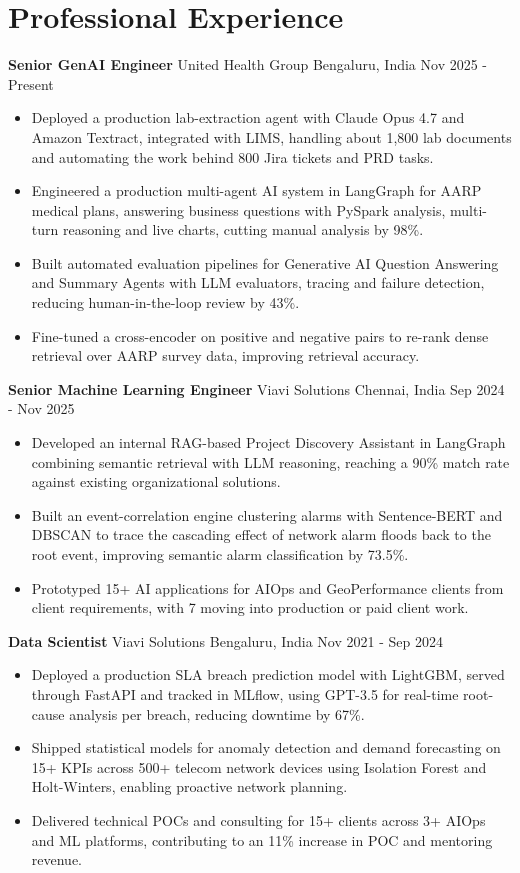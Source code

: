 \documentclass[10pt,a4paper]{article}
\newcommand{\role}[4]{\textbf{#1} \textbar{} #2 \hfill #3 \textbar{} #4\par}
\begin{document}
\section{Professional Experience}
\role{Senior GenAI Engineer}{United Health Group}{Bengaluru, India}{Nov 2025 - Present}
\begin{itemize}
  \item Deployed a production lab-extraction agent with Claude Opus 4.7 and Amazon Textract, integrated with LIMS, handling about 1,800 lab documents and automating the work behind 800 Jira tickets and PRD tasks.
  \item Engineered a production multi-agent AI system in LangGraph for AARP medical plans, answering business questions with PySpark analysis, multi-turn reasoning and live charts, cutting manual analysis by 98\%.
  \item Built automated evaluation pipelines for Generative AI Question Answering and Summary Agents with LLM evaluators, tracing and failure detection, reducing human-in-the-loop review by 43\%.
  \item Fine-tuned a cross-encoder on positive and negative pairs to re-rank dense retrieval over AARP survey data, improving retrieval accuracy.
\end{itemize}
\vspace{3pt}
\role{Senior Machine Learning Engineer}{Viavi Solutions}{Chennai, India}{Sep 2024 - Nov 2025}
\begin{itemize}
  \item Developed an internal RAG-based Project Discovery Assistant in LangGraph combining semantic retrieval with LLM reasoning, reaching a 90\% match rate against existing organizational solutions.
  \item Built an event-correlation engine clustering alarms with Sentence-BERT and DBSCAN to trace the cascading effect of network alarm floods back to the root event, improving semantic alarm classification by 73.5\%.
  \item Prototyped 15+ AI applications for AIOps and GeoPerformance clients from client requirements, with 7 moving into production or paid client work.
\end{itemize}
\vspace{3pt}
\role{Data Scientist}{Viavi Solutions}{Bengaluru, India}{Nov 2021 - Sep 2024}
\begin{itemize}
  \item Deployed a production SLA breach prediction model with LightGBM, served through FastAPI and tracked in MLflow, using GPT-3.5 for real-time root-cause analysis per breach, reducing downtime by 67\%.
  \item Shipped statistical models for anomaly detection and demand forecasting on 15+ KPIs across 500+ telecom network devices using Isolation Forest and Holt-Winters, enabling proactive network planning.
  \item Delivered technical POCs and consulting for 15+ clients across 3+ AIOps and ML platforms, contributing to an 11\% increase in POC and mentoring revenue.
\end{itemize}
\end{document}
